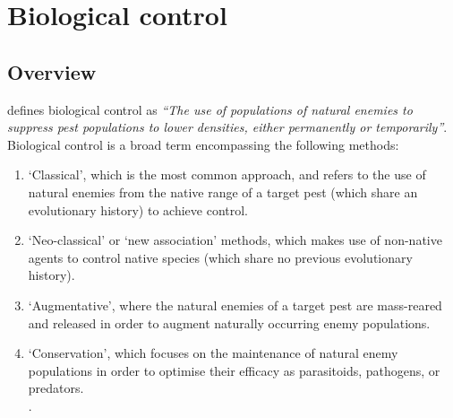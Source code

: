\section{Biological control}
\subsection{Overview}
\citet{VanDriesche2009} defines biological control as \textit{``The use of populations of natural enemies to suppress pest populations to lower densities, either permanently or temporarily''}. Biological control is a broad term encompassing the following methods: 
\vspace{0.4cm}
\begin{enumerate}
    \item `Classical', which is the most common approach, and refers to the use of natural enemies from the native range of a target pest (which share an evolutionary history) to achieve control.
    \item `Neo-classical' or `new association' methods, which makes use of non-native agents to control native species (which share no previous evolutionary history).
    \item `Augmentative', where the natural enemies of a target pest are mass-reared and released in order to augment naturally occurring enemy populations.
    \item `Conservation', which focuses on the maintenance of natural enemy populations in order to optimise their efficacy as parasitoids, pathogens, or predators. \\
    \citep{mcfadyen1998biological, collier2004critical,  VanDriesche2009, gullan2014insects, begg2017functional}.
\end{enumerate}
\vspace{0.4cm}

